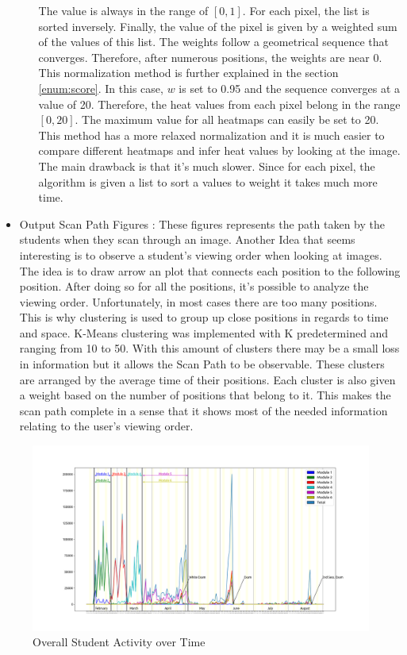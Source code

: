 \documentclass[a4paper,11pt]{report}
\numberwithin{figure}{section} %
\begin{document}
\begin{itemize}
\begin{itemize}
            The value is always in the range of $[0,1]$.
            For each pixel, the list is sorted inversely.
            Finally, the value of the pixel is given by a weighted sum of the values of this list.
            The weights follow a geometrical sequence that converges.
            Therefore, after numerous positions, the weights are near 0.
            This normalization method is further explained in the section \ref{enum:score}.
            In this case, $w$ is set to 0.95 and the sequence converges at a value of 20.
            Therefore, the heat values from each pixel belong in the range $[0,20]$.
            The maximum value for all heatmaps can easily be set to 20.
            This method has a more relaxed normalization and it is much easier to compare different heatmaps and infer heat values by looking at the image.
            The main drawback is that it's much slower.
            Since for each pixel, the algorithm is given a list to sort a values to weight it takes much more time.
        \end{itemize}
        \item[\textbullet] Output Scan Path Figures : These figures represents the path taken by the students when they scan through an image.
        Another Idea that seems interesting is to observe a student's viewing order when looking at images.
        The idea is to draw arrow an plot that connects each position to the following position.
        After doing so for all the positions, it's possible to analyze the viewing order.
        Unfortunately, in most cases there are too many positions.
        This is why clustering is used to group up close positions in regards to time and space.
        K-Means clustering was implemented with K predetermined and ranging from 10 to 50.
        With this amount of clusters there may be a small loss in information but it allows the Scan Path to be observable.
        These clusters are arranged by the average time of their positions.
        Each cluster is also given a weight based on the number of positions that belong to it.
        This makes the scan path complete in a sense that it shows most of the needed information relating to the user's viewing order.
    \end{itemize}
    \begin{figure}[H]
      \centering
      \includegraphics[width=.9\linewidth]{timelapse.png}
      \caption{Overall Student Activity over Time}
      \label{fig:timelapse}
    \end{figure}
\end{document}
